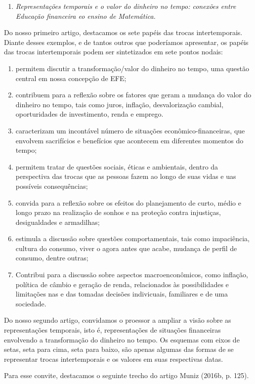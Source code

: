 \begin{paginatexto2}
\begin{enumerate}
  \item \textit{Representações temporais e o valor do dinheiro no tempo: conexões entre Educação financeira eo ensino de Matemática.}
\end{enumerate}

Do nosso primeiro artigo, destacamos os sete papéis das trocas intertemporais. Diante desses exemplos, e de tantos outros que poderíamos apresentar, os papéis das trocas intertemporais podem ser sintetizados em sete pontos nodais:
\begin{enumerate}
  \item permitem discutir a transformação/valor do dinheiro no tempo, uma questão central em nossa concepção de EFE;
  \item contribuem para a reflexão sobre os fatores que geram a mudança do valor do dinheiro no tempo, tais como juros, inflação, desvalorização cambial, oporturidades de investimento, renda e emprego.
  \item caracterizam um incontável número de situações econômico-financeiras, que envolvem sacrifícios e benefícios que acontecem em diferentes momentos do tempo;
  \item permitem tratar de questões sociais, éticas e ambientais, dentro da perspectiva das trocas que as pessoas fazem ao longo de suas vidas e uas possíveis consequências;
  \item convida para a reflexão sobre os efeitos do planejamento de curto, médio e longo prazo na realização de sonhos e na proteção contra injustiças, desigualdades e armadilhas;
  \item estimula a discussão sobre questões comportamentais, tais como impaciência, cultura do consumo, viver o agora antes que acabe, mudança de perfil de consumo, dentre outras;
  \item Contribui para a discussão sobre aspectos macroenconômicos, como inflação, política de câmbio e geração de renda, relacionados às possibilidades e limitações nas e das tomadas decisões indivicuais, familiares e de uma sociedade.
\end{enumerate}
  Do nosso segundo artigo, convidamos o proessor a ampliar a visão sobre as representações temporais, isto é, representações de situações financeiras envolvendo a transformação do dinheiro no tempo. Os esquemas com eixos de setas, seta para cima, seta para baixo, são apenas algumas das formas de se representar trocas intertemporais e os valores em suas respectivas datas.

  Para esse convite, destacamos o seguinte trecho do artigo Muniz (2016b, p. 125).


\end{paginatexto2}
